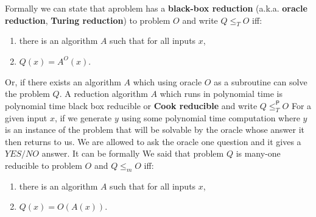 Formally we can state that aproblem has a \textbf{black-box reduction} (a.k.a. \textbf{oracle reduction}, \textbf{Turing reduction}) to problem $O$ and write $Q \leq_T O$ iff:
\begin{enumerate}
    \item there is an algorithm $A$ such that for all inputs $x$,
    \item $Q(x) = A^O(x)$.
\end{enumerate}

Or, if there exists an algorithm $A$ which using oracle $O$ as a subroutine can solve the problem $Q$. A reduction algorithm $A$ which runs in polynomial time is polynomial time black box reducible or \textbf{Cook reducible} and 
write $Q\leq^\mathsf{P}_T O$ For a given input $x$,  if we generate $y$ using some polynomial time computation where $y$ is an instance of the problem that will be solvable by the oracle whose answer it then returns to us. We are allowed to ask the oracle one question and it gives a $YES/NO$ answer. It can be formally We said that problem $Q$ is many-one reducible to problem $O$ and $Q \leq_m O$ iff:
\begin{enumerate}
    \item there is an algorithm $A$ such that for all inputs $x$,  
    \item $Q(x) = O(A(x))$.
\end{enumerate}